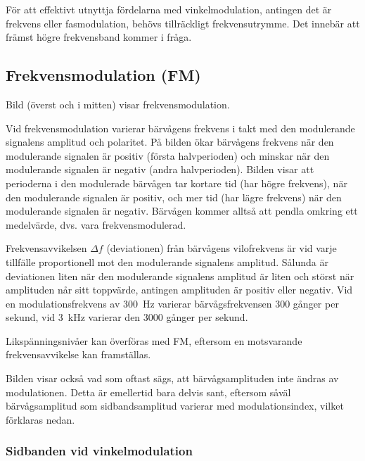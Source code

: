 För att effektivt utnyttja fördelarna med vinkelmodulation, antingen det är
frekvens eller fasmodulation, behövs tillräckligt frekvensutrymme.
Det innebär att främst högre frekvensband kommer i fråga.

\newpage
\subsection{Frekvensmodulation (FM)}
\label{modulation_fm}


Bild  (överst och i mitten) visar frekvensmodulation.

Vid frekvensmodulation varierar bärvågens frekvens i takt med den modulerande
signalens amplitud och polaritet.
På bilden ökar bärvågens frekvens när den modulerande signalen är positiv
(första halvperioden) och minskar när den modulerande signalen är negativ
(andra halvperioden).
Bilden visar att perioderna i den modulerade bärvågen tar kortare tid (har
högre frekvens), när den modulerande signalen är positiv, och mer tid (har lägre
frekvens) när den modulerande signalen är negativ.
Bärvågen kommer alltså att pendla omkring ett medelvärde, dvs. vara
frekvensmodulerad.

Frekvensavvikelsen \(\Delta f\) (deviationen) från bärvågens vilofrekvens är
vid varje tillfälle proportionell mot den modulerande signalens amplitud.
Sålunda är deviationen liten när den modulerande signalens amplitud är liten
och störst när amplituden når sitt toppvärde, antingen amplituden är positiv
eller negativ.
Vid en modulationsfrekvens av \qty{300}{\hertz} varierar bärvågsfrekvensen 300
gånger per sekund, vid \qty{3}{\kilo\hertz} varierar den 3000 gånger per sekund.

Likspänningsnivåer kan överföras med FM, eftersom en motsvarande
frekvensavvikelse kan framställas.

Bilden visar också vad som oftast sägs, att bärvågsamplituden inte ändras av
modulationen.
Detta är emellertid bara delvis sant, eftersom såväl bärvågsamplitud som
sidbandsamplitud varierar med modulationsindex, vilket förklaras nedan.

\subsubsection{Sidbanden vid vinkelmodulation}

